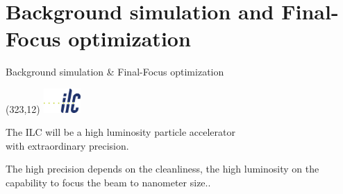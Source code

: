 \documentclass[xcolor={dvipsnames}]{beamer}
\newcommand{\ilclogo}{
  \setlength{\TPHorizModule}{1pt}
  \setlength{\TPVertModule}{1pt}
  \begin{textblock}{1}(323,12)
   \includegraphics[width=40pt,height=26pt]{figures/ILC.jpeg}
  \end{textblock}
}
\begin{document}
\section{Background simulation and Final-Focus optimization}
\begin{frame}{Background simulation \& Final-Focus optimization}
\ilclogo
\begin{block}{}
\centering The ILC will be a \textcolor{Periwinkle}{high luminosity} particle accelerator \\with \textcolor{JungleGreen}{extraordinary precision}.
\end{block}
\vspace*{1cm}
\textcolor{JungleGreen}{The high precision depends on the cleanliness}, \textcolor{Periwinkle}{the high luminosity on the capability to focus the beam to nanometer size.}.\\
\vspace*{0.5cm}
\end{frame}
\end{document}
